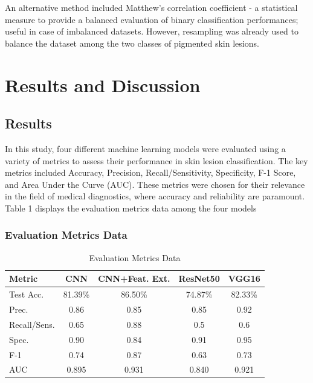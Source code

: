 \documentclass[10pt,twocolumn]{article}
\begin{document}
An alternative method included Matthew’s correlation coefficient - a statistical measure to provide a balanced evaluation of binary classification performances; useful in case of imbalanced datasets. However, resampling was already used to balance the dataset among the two classes of pigmented skin lesions.

\section{Results and Discussion}
\subsection{Results}
In this study, four different machine learning models were evaluated using a variety of metrics to assess their performance in skin lesion classification. The key metrics included Accuracy, Precision, Recall/Sensitivity, Specificity, F-1 Score, and Area Under the Curve (AUC). These metrics were chosen for their relevance in the field of medical diagnostics, where accuracy and reliability are paramount. Table 1 displays the evaluation metrics data among the four models
\subsubsection{Evaluation Metrics Data}
\begin{table}[h]
\centering
\caption{Evaluation Metrics Data}
\scriptsize
\setlength\tabcolsep{3pt} 
\begin{tabular}{|l|c|c|c|c|}
\hline
\textbf{Metric} & \textbf{CNN} & \textbf{CNN+Feat. Ext.} & \textbf{ResNet50} & \textbf{VGG16} \\ \hline
Test Acc. & 81.39\% & 86.50\% & 74.87\% & 82.33\% \\ \hline
Prec. & 0.86 & 0.85 & 0.85 & 0.92 \\ \hline
Recall/Sens. & 0.65 & 0.88 & 0.5 & 0.6 \\ \hline
Spec. & 0.90 & 0.84 & 0.91 & 0.95 \\ \hline
F-1 & 0.74 & 0.87 & 0.63 & 0.73 \\ \hline
AUC & 0.895 & 0.931 & 0.840 & 0.921 \\ \hline
\end{tabular}
\end{table}
\end{document}
